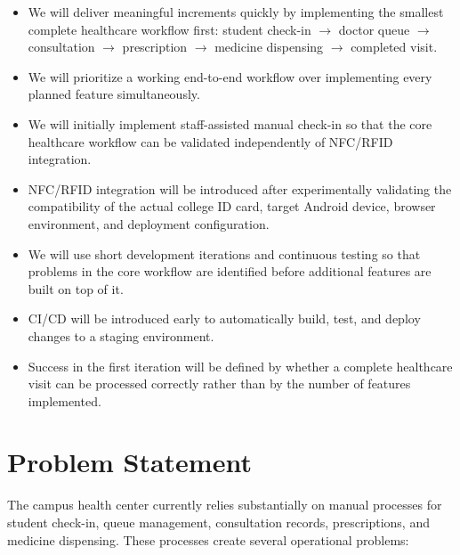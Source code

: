 \documentclass[11pt,a4paper]{article}
\begin{document}
\begin{itemize}

    \item We will deliver meaningful increments quickly by implementing the smallest complete healthcare workflow first: student check-in $\rightarrow$ doctor queue $\rightarrow$ consultation $\rightarrow$ prescription $\rightarrow$ medicine dispensing $\rightarrow$ completed visit.

    \item We will prioritize a working end-to-end workflow over implementing every planned feature simultaneously.

    \item We will initially implement staff-assisted manual check-in so that the core healthcare workflow can be validated independently of NFC/RFID integration.

    \item NFC/RFID integration will be introduced after experimentally validating the compatibility of the actual college ID card, target Android device, browser environment, and deployment configuration.

    \item We will use short development iterations and continuous testing so that problems in the core workflow are identified before additional features are built on top of it.

    \item CI/CD will be introduced early to automatically build, test, and deploy changes to a staging environment.

    \item Success in the first iteration will be defined by whether a complete healthcare visit can be processed correctly rather than by the number of features implemented.

\end{itemize}


\section{Problem Statement}

The campus health center currently relies substantially on manual processes for student check-in, queue management, consultation records, prescriptions, and medicine dispensing. These processes create several operational problems:
\end{document}
